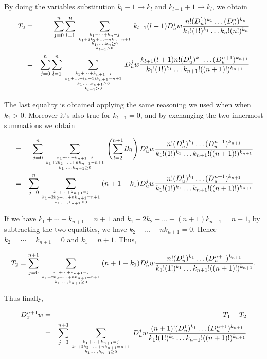 \documentclass[a4paper,12pt]{article}
\newcommand{\ra}{\rightarrow}
\begin{document}
By doing the variables substitution $k_l - 1 \ra k_l$ and $k_{l+1} + 1
\ra k_l$, we obtain
\begin{eqnarray*}
  T_2 &=& \sum_{j=0}^n \sum_{l=1}^n \sum_{k_1+\cdots+k_n = j \atop {
      k_1 + 2k_2 + \ldots + n k_n = n+1 \atop {
        k_1, \ldots, k_n \ge 0 \atop k_{l+1} > 0}}} k_{l+1}(l+1) D_u^j
  w \frac{n!(D_u^1)^{k_1} \ldots (D_u^n)^{k_n}}{k_1!(1!)^{k_1} \ldots
    k_n!(n!)^{k_n}} \\
  &=& \sum_{j=0}^n \sum_{l=1}^n \sum_{k_1+\cdots+k_{n+1} = j \atop {
      k_1 + \ldots + (n+1) k_{n+1} = n+1 \atop {
        k_1, \ldots, k_{n+1} \ge 0 \atop k_{l+1} > 0}}} D_u^j
  w \frac{k_{l+1}(l+1) n!(D_u^1)^{k_1} \ldots
    (D_u^{n+1})^{k_{n+1}}}{k_1!(1!)^{k_1} \ldots k_{n+1}!((n+1)!)^{k_{n+1}}} \\
\end{eqnarray*}

The last equality is obtained applying the same reasoning we used when
when $k_1 > 0$.  Moreover it's also true for $k_{l+1} = 0$, and by
exchanging the two innermost summations we obtain

\begin{eqnarray*}
  &=& \sum_{j=0}^n \sum_{k_1+\cdots+k_{n+1} = j \atop {
      k_1 + 2k_2 + \ldots + n k_{n+1} = n+1 \atop {
        k_1, \ldots, k_{n+1} \ge 0}}} \left(\sum_{l=2}^{n+1}lk_l\right) D_u^j
  w \frac{n!(D_u^1)^{k_1} \ldots (D_u^{n+1})^{k_{n+1}}}{k_1!(1!)^{k_1} \ldots
    k_{n+1}!((n+1)!)^{k_{n+1}}} \\
  &=& \sum_{j=0}^n \sum_{k_1+\cdots+k_{n+1} = j \atop {
      k_1 + 2k_2 + \ldots + n k_{n+1} = n+1 \atop {
        k_1, \ldots, k_{n+1} \ge 0}}} (n+1-k_1) D_u^j
  w \frac{n!(D_u^1)^{k_1} \ldots (D_u^{n+1})^{k_{n+1}}}{k_1!(1!)^{k_1} \ldots
    k_{n+1}!((n+1)!)^{k_{n+1}}} \\
\end{eqnarray*}

If we have $k_1+\cdots+k_{n+1} = n+1$ and $k_1 + 2k_2 + \ldots + (n+1)
k_{n+1} = n+1$, by subtracting the two equalities, we have $k_2 +
\ldots + nk_{n+1} = 0$.  Hence $k_2 = \cdots = k_{n+1} = 0$ and $k_1 =
n+1$.  Thus,

\[ T_2 = \sum_{j=0}^{n+1} \sum_{k_1+\cdots+k_{n+1} = j \atop {
      k_1 + 2k_2 + \ldots + n k_{n+1} = n+1 \atop {
        k_1, \ldots, k_{n+1} \ge 0}}} (n+1-k_1) D_u^j
  w \frac{n!(D_u^1)^{k_1} \ldots (D_u^{n+1})^{k_{n+1}}}{k_1!(1!)^{k_1} \ldots
    k_{n+1}!((n+1)!)^{k_{n+1}}} .
  \]

Thus finally,

\begin{eqnarray*}
  D_x^{n+1}w &=& T_1 + T_2 \\
  &=& \sum_{j=0}^{n+1} \sum_{k_1+\cdots+k_{n+1} = j \atop {
      k_1 + 2k_2 + \ldots + n k_{n+1} = n+1 \atop {
        k_1, \ldots, k_{n+1} \ge 0}}} D_u^j
  w \frac{(n+1)!(D_u^1)^{k_1} \ldots (D_u^{n+1})^{k_{n+1}}}{k_1!(1!)^{k_1} \ldots
    k_{n+1}!((n+1)!)^{k_{n+1}}}
\end{eqnarray*}
\end{document}
